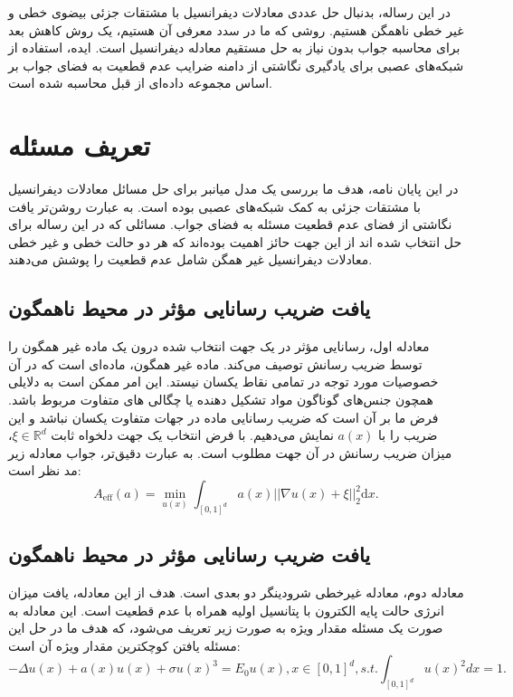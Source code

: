 در این رساله، بدنبال حل عددی معادلات دیفرانسیل با مشتقات جزئی بیضوی خطی و غیر خطی ناهمگن هستیم. روشی که ما در سدد معرفی آن هستیم، یک روش کاهش بعد برای محاسبه جواب بدون نیاز به حل مستقیم معادله دیفرانسیل است. ایده، استفاده از شبکه‌های عصبی برای یادگیری نگاشتی از دامنه ضرایب عدم قطعیت به فضای جواب بر اساس مجموعه داده‌ای از قبل محاسبه شده است.
\clearpage
\newpage
\section*{تعریف مسئله }
در این پایان نامه، هدف ما بررسی یک مدل میانبر برای حل مسائل معادلات دیفرانسیل با مشتقات جزئی به کمک شبکه‌های عصبی بوده است. به عبارت روشن‌تر یافت نگاشتی از فضای عدم قطعیت مسئله به فضای جواب. مسائلی که در این رساله برای حل انتخاب شده اند از این جهت حائز اهمیت بوده‌اند که هر دو حالت خطی و غیر خطی معادلات دیفرانسیل غیر همگن شامل عدم قطعیت را پوشش می‌دهند. \\
\subsection*{یافت ضریب رسانایی مؤثر در محیط ناهمگون}
معادله اول، رسانایی مؤثر در یک جهت انتخاب شده درون یک ماده غیر همگون را توسط ضریب رسانش توصیف می‌کند. ماده غیر همگون، ماده‌ای است که در آن خصوصیات مورد توجه در تمامی نقاط یکسان نیستد. این امر ممکن است به دلایلی همچون جنس‌های گوناگون مواد تشکیل دهنده یا چگالی های متفاوت مربوط باشد. فرض ما بر آن است که ضریب رسانایی ماده در جهات متفاوت یکسان نباشد و این ضریب را با $a(x)$ نمایش می‌دهیم. با فرض انتخاب یک جهت دلخواه ثابت $\xi \in \mathbb{R}^d$، میزان ضریب رسانش در آن جهت مطلوب است. به عبارت دقیق‌تر، جواب معادله زیر مد نظر است:
\begin{equation*}
A_{\text{eff}}(a) = \min_{u(x)} \int_{[0,1]^d} a(x) ||\nabla u(x) + \xi||_{2}^{2} \mathrm{d}x.
\end{equation*}
\subsection*{یافت ضریب رسانایی مؤثر در محیط ناهمگون}
معادله دوم، معادله غیرخطی شرودینگر دو بعدی است. هدف از این معادله، یافت میزان انرژی حالت پایه الکترون با پتانسیل اولیه همراه با عدم قطعیت است. این معادله به صورت یک مسئله مقدار ویژه به صورت زیر تعریف می‌شود، که هدف ما در حل این مسئله یافتن کوچکترین مقدار ویژه آن است:
\begin{equation}
-\Delta u(x) + a(x)u(x) + \sigma u(x)^3 = E_0 u(x), x\in [0,1]^d, s.t. \int_{[0,1]^d}u(x)^2 dx = 1.
\end{equation}
 \clearpage
 \newpage
